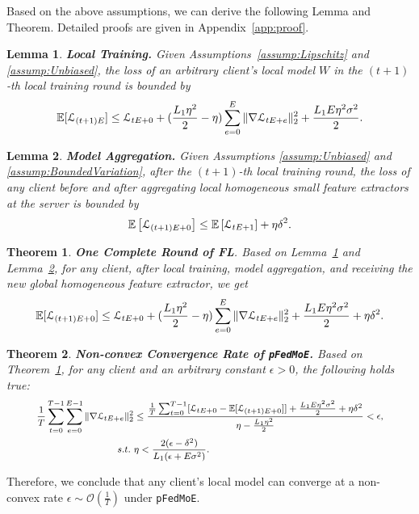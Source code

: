 \documentclass[sigconf]{acmart}
\newtheorem{theorem}{Theorem}
\newtheorem{lemma}{Lemma}
\newcommand{\homo}{homogeneous }
\newcommand{\methodname}{{\tt{pFedMoE}}}
\begin{document}
Based on the above assumptions, we can derive the following Lemma and Theorem. Detailed proofs are given in Appendix~\ref{app:proof}.

\begin{lemma}\label{lemma:localtraining}
    \textbf{Local Training.} Given Assumptions~\ref{assump:Lipschitz} and \ref{assump:Unbiased}, the loss of an arbitrary client's local model $W$ in the $(t+1)$-th local training round is bounded by 
    \begin{equation}
    \footnotesize
        \mathbb{E}[\mathcal{L}_{(t+1) E}] \leq \mathcal{L}_{t E+0}+(\frac{L_1 \eta^2}{2}-\eta) \sum_{e=0}^E\|\nabla \mathcal{L}_{t E+e}\|_2^2+\frac{L_1 E \eta^2 \sigma^2}{2}. 
    \end{equation}
\end{lemma}


\begin{lemma}\label{lemma:aggregation}
\textbf{Model Aggregation.} Given Assumptions \ref{assump:Unbiased} and \ref{assump:BoundedVariation}, after the $(t+1)$-th local training round, the loss of any client before and after aggregating local \homo small feature extractors at the server is bounded by
\begin{equation}
 \footnotesize   \mathbb{E}\left[\mathcal{L}_{(t+1)E+0}\right]\le\mathbb{E}\left[\mathcal{L}_{tE+1}\right]+{\eta\delta}^2.
\end{equation}
\end{lemma}


\begin{theorem}\label{theorem:one-round}
\textbf{One Complete Round of FL}. Based on Lemma~\ref{lemma:localtraining} and Lemma~\ref{lemma:aggregation}, for any client, after local training, model aggregation, and receiving the new global \homo feature extractor, we get
\begin{equation}
\footnotesize
\mathbb{E}[\mathcal{L}_{(t+1) E+0}] \leq \mathcal{L}_{t E+0}+(\frac{L_1 \eta^2}{2}-\eta) \sum_{e=0}^E\|\nabla \mathcal{L}_{t E+e}\|_2^2+\frac{L_1 E \eta^2 \sigma^2}{2}+\eta \delta^2.
\end{equation}
\end{theorem}

\begin{theorem}\label{theorem:non-convex}
\textbf{Non-convex Convergence Rate of \methodname{}.} Based on Theorem~\ref{theorem:one-round}, for any client and an arbitrary constant $\epsilon>0$, the following holds true:
\begin{equation}
\footnotesize
\begin{aligned}
\frac{1}{T} \sum_{t=0}^{T-1} \sum_{e=0}^{E-1}\|\nabla \mathcal{L}_{t E+e}\|_2^2 &\leq \frac{\frac{1}{T} \sum_{t=0}^{T-1}[\mathcal{L}_{t E+0}-\mathbb{E}[\mathcal{L}_{(t+1) E+0}]]+\frac{L_1 E \eta^2 \sigma^2}{2}+\eta \delta^2}{\eta-\frac{L_1 \eta^2}{2}}<\epsilon, \\
s.t. \   &\eta<\frac{2(\epsilon-\delta^2)}{L_1(\epsilon+E \sigma^2)} .
\end{aligned}
\end{equation}
\end{theorem}
Therefore, we conclude that any client's local model can converge at a non-convex rate $\epsilon \sim \mathcal{O}(\frac{1}{T})$ under \methodname{}.
\end{document}
